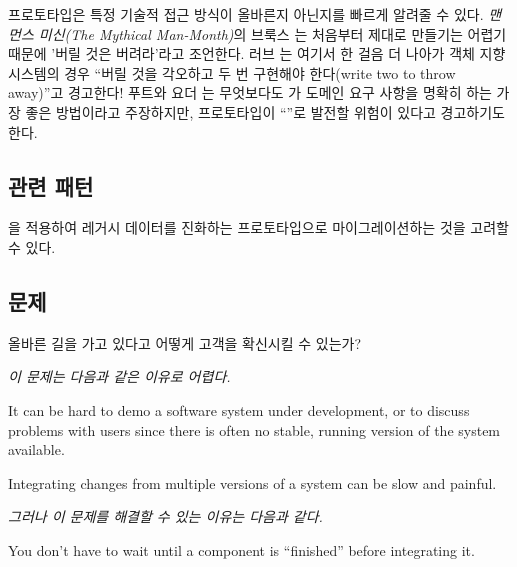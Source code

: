 \documentclass[a4paper,10pt,twoside]{book}
\begin{document}
프로토타입은 특정 기술적 접근 방식이 올바른지 아닌지를 빠르게 알려줄 수 있다. \emph{맨먼스 미신(The Mythical Man-Month)}의 브룩스 \cite{Broo75a}는 처음부터 제대로 만들기는 어렵기 때문에 '버릴 것은 버려라'라고 조언한다.
러브 \cite{Love93a}는 여기서 한 걸음 더 나아가 객체 지향 시스템의 경우 ``버릴 것을 각오하고 두 번 구현해야 한다(write two to throw away)''고 경고한다! 푸트와 요더 \cite{Foot00a}는 무엇보다도 가 도메인 요구 사항을 명확히 하는 가장 좋은 방법이라고 주장하지만, 프로토타입이 ``''로 발전할 위험이 있다고 경고하기도 한다.

\subsection*{관련 패턴}

을 적용하여 레거시 데이터를 진화하는 프로토타입으로 마이그레이션하는 것을 고려할 수 있다.




\subsection*{문제}

올바른 길을 가고 있다고 어떻게 고객을 확신시킬 수 있는가?

\emph{이 문제는 다음과 같은 이유로 어렵다.}

\begin{bulletlist}
\item It can be hard to demo a software system under development, or to discuss problems with users since there is often no stable, running version of the system available.

\item Integrating changes from multiple versions of a system can be slow and painful.
\end{bulletlist}

\emph{그러나 이 문제를 해결할 수 있는 이유는 다음과 같다.}

\begin{bulletlist}
\item You don't have to wait until a component is ``finished'' before integrating it.
\end{bulletlist}
\end{document}
